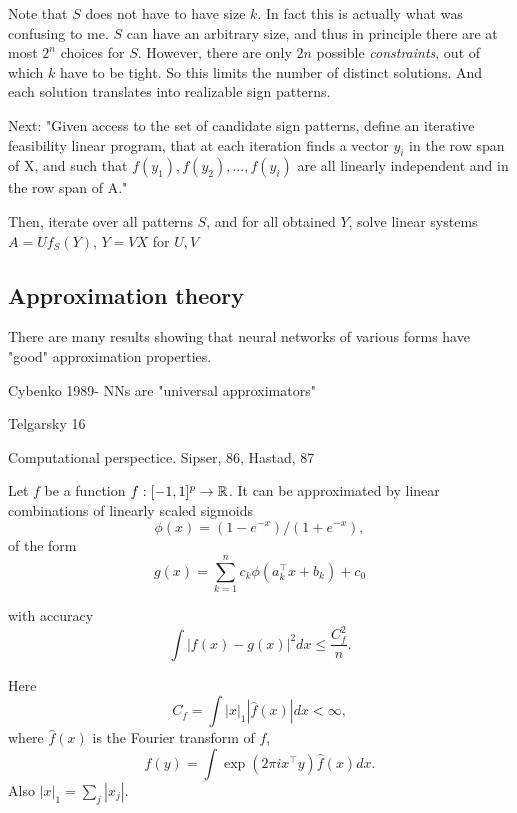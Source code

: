 \documentclass[english]{article}
\begin{document}
Note that $S$ does not have to have size $k$. In fact this is actually what was confusing to me. $S$ can have an arbitrary size, and thus in principle there are at most $2^n$ choices for $S$. However, there are only $2n$ possible \emph{constraints}, out of which $k$ have to be tight. So this limits the number of distinct solutions. And each solution translates into realizable sign patterns.


Next: "Given access to the set of candidate sign patterns, define an iterative feasibility linear program, that at each iteration finds a vector $y_i$ in the row span of X, and such that $f(y_1 ),f(y_2 ),...,f(y_i)$ are all linearly independent and in the row span of A."

Then, iterate over all patterns $S$, and for all obtained $Y$, solve linear systems $A=Uf_S(Y)$, $Y=VX$ for $U,V$





\eenum 

\subsection{Approximation theory}

There are many results showing that neural networks of various forms have "good" approximation properties. 

\benum 
\item Cybenko 1989- NNs are "universal approximators"

Telgarsky 16

\item 
Computational perspectice. Sipser, 86, Hastad, 87



\item
\begin{theorem}[Barron, 1993]

Let $f$ be a function $f:[-1,1]^p \to \mathbb{R}$. It can be approximated by linear combinations of linearly scaled sigmoids $$\phi(x) = (1-e^{-x})/(1+e^{-x}),$$ of the form $$g(x) = \sum_{k=1}^n c_k \phi (a_k^\top x +b_k)+c_0$$ 

with accuracy $$\int |f(x)-g(x)|^2 dx \le \frac{C_f^2 }{n}.$$

Here $$C_f = \int |x|_1 |\hat f(x)|dx <\infty,$$ where $\hat f(x)$ is the Fourier transform of $f$, 
$$f(y) = \int\exp(2\pi i x^\top y) \hat f(x) dx.$$ Also $|x|_1 = \sum_j |x_j|$. 
\end{theorem}


\item 
\end{document}
